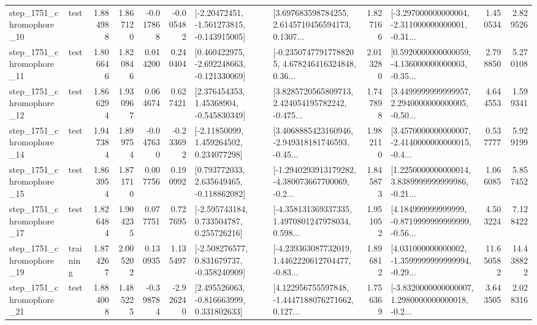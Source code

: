 \begin{tabular}{llrrrrllrlrr}
 step\_1751\_chromophore\_10 &      test &      1.884988 &    1.867120 &     -0.017868 & -0.005482 &   [-2.20472451, -1.561273815, -0.143915005] &  [3.697683598784255, 2.6145710456594173, 0.1307... &       1.827166 &  [-3.297000000000004, -2.311000000000001, -0.31... &            1.450534 &          2.829526 \\
 step\_1751\_chromophore\_11 &      test &      1.806646 &    1.820846 &      0.014200 &  0.240404 &   [0.460422975, -2.692248663, -0.121330069] &  [-0.23507477917788205, 4.678246416324848, 0.36... &       2.013280 &  [0.5920000000000059, -4.136000000000003, -0.35... &            2.798850 &          5.270108 \\
 step\_1751\_chromophore\_12 &      test &      1.866294 &    1.930967 &      0.064674 &  0.627421 &     [2.376454353, 1.45368904, -0.545830349] &  [3.8285720565809713, 2.424054195782242, -0.475... &       1.747898 &  [3.4499999999999957, 2.2940000000000005, -0.50... &            4.644553 &          1.599341 \\
 step\_1751\_chromophore\_14 &      test &      1.947384 &    1.899754 &     -0.047630 & -0.233692 &     [-2.11850099, 1.459264502, 0.234077298] &  [3.4068885423160946, -2.949318181746593, -0.45... &       1.982110 &  [3.4570000000000007, -2.4140000000000015, -0.4... &            0.537777 &          5.929199 \\
 step\_1751\_chromophore\_15 &      test &      1.863954 &    1.871710 &      0.007756 &  0.190992 &    [0.793772033, 2.635649465, -0.118862082] &  [-1.2940293913179282, -4.380073667700069, -0.2... &       1.845873 &  [1.2250000000000014, 3.8389999999999986, -0.21... &            1.066085 &          5.857452 \\
 step\_1751\_chromophore\_17 &      test &      1.826484 &    1.904235 &      0.077751 &  0.727695 &    [-2.595743184, 0.733504787, 0.255726216] &  [-4.358131369337335, 1.4970801247978034, 0.598... &       1.951052 &  [4.184999999999999, -0.8719999999999999, -0.56... &            4.503224 &          7.128422 \\
 step\_1751\_chromophore\_19 &  training &      1.874267 &    2.005202 &      0.130935 &  1.135497 &   [-2.508276577, 0.831679737, -0.358240909] &  [-4.239363087732019, 1.4462220612704477, -0.83... &       1.896812 &  [4.031000000000002, -1.3599999999999994, -0.29... &           11.650582 &         14.438822 \\
 step\_1751\_chromophore\_21 &      test &      1.884008 &    1.485225 &     -0.398784 & -2.926240 &    [2.495526063, -0.816663999, 0.331802633] &  [4.122956755597848, -1.4447188076271662, 0.127... &       1.756369 &  [-3.8320000000000007, 1.2980000000000018, -0.2... &            3.643505 &          2.028316 \\

\end{tabular}
